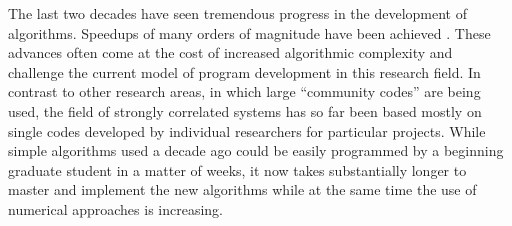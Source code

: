 \documentclass[12pt]{iopart}
\begin{document}
The last two decades have seen tremendous progress in the development of
algorithms.  Speedups of many orders of magnitude have been 
achieved \cite{Evertz03,Troyer03,White1992,Schollwock2005,vidal1,vidal2,Daley2004,White2004,Rubtsov04,Rubtsov05,Werner06,Werner06Kondo, Gull08_ctaux}. These
advances often come at the cost of increased algorithmic
complexity and challenge the current model of program development in
this research field. In contrast to other research areas, in which
large ``community codes'' are being used, the field of strongly
correlated systems has so far been based mostly on single codes developed by
individual researchers for particular projects. While simple
algorithms used a decade ago could be easily programmed by a beginning
graduate student in a matter of weeks, it now takes substantially
longer to master and implement the new algorithms while at the same time the use of numerical approaches is increasing.  
\end{document}
